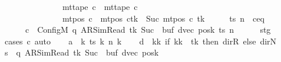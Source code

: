 \begin{isabellebody}
\ \ \ \ \ \ \ \ \ \ \ \ \ \ {\isasymand}\ mt{\isacharunderscore}{\kern0pt}tape\ c{\isacharprime}{\kern0pt}{\isacharprime}{\kern0pt}\ {\isacharequal}{\kern0pt}\ mt{\isacharunderscore}{\kern0pt}tape\ c{\isacharprime}{\kern0pt}\isanewline
\ \ \ \ \ \ \ \ \ \ \ \ \ \ {\isasymand}\ mt{\isacharunderscore}{\kern0pt}pos\ c{\isacharprime}{\kern0pt}{\isacharprime}{\kern0pt}\ {\isacharequal}{\kern0pt}\ {\isacharparenleft}{\kern0pt}mt{\isacharunderscore}{\kern0pt}pos\ c{\isacharprime}{\kern0pt}{\isacharparenright}{\kern0pt}{\isacharparenleft}{\kern0pt}tk\ {\isacharcolon}{\kern0pt}{\isacharequal}{\kern0pt}\ Suc\ {\isacharparenleft}{\kern0pt}mt{\isacharunderscore}{\kern0pt}pos\ c{\isacharprime}{\kern0pt}\ tk{\isacharparenright}{\kern0pt}{\isacharparenright}{\kern0pt}{\isachardoublequoteclose}\isanewline
%
\isadelimproof
%
\endisadelimproof
%
\isatagproof
{}\isamarkupfalse%
\ {\isacharminus}{\kern0pt}\isanewline
\ \ \isamarkupfalse%
\ ts\ n\ \ c{\isacharprime}{\kern0pt}{\isacharunderscore}{\kern0pt}eq{\isacharcolon}{\kern0pt}\isanewline
\ \ \ \ \ \ {\isachardoublequoteopen}c{\isacharprime}{\kern0pt}\ {\isacharequal}{\kern0pt}\ Config\isactrlsub M\ {\isacharparenleft}{\kern0pt}q{\isacharcomma}{\kern0pt}\ AR{\isacharunderscore}{\kern0pt}SimRead{\isacharcomma}{\kern0pt}\ tk{\isacharcomma}{\kern0pt}\ Suc\ {}{\isacharcomma}{\kern0pt}\ buf{\isacharcomma}{\kern0pt}\ dvec{\isacharcomma}{\kern0pt}\ posk{\isacharparenright}{\kern0pt}\ ts\ n{\isachardoublequoteclose}\isanewline
\ \ \ \ \isamarkupfalse%
\ stg\ \isamarkupfalse%
\ {\isacharparenleft}{\kern0pt}cases\ c{\isacharprime}{\kern0pt}{\isacharparenright}{\kern0pt}\ auto\isanewline
\ \ \isamarkupfalse%
\ {\isacharquery}{\kern0pt}a\ {\isacharequal}{\kern0pt}\ {\isachardoublequoteopen}{\isasymlambda}k{\isachardot}{\kern0pt}\ ts\ k\ {\isacharparenleft}{\kern0pt}n\ k{\isacharparenright}{\kern0pt}{\isachardoublequoteclose}\isanewline
\ \ \isamarkupfalse%
\ {\isacharquery}{\kern0pt}d\ {\isacharequal}{\kern0pt}\ {\isachardoublequoteopen}{\isasymlambda}kk{\isachardot}{\kern0pt}\ if\ kk\ {\isacharequal}{\kern0pt}\ tk\ then\ dir{\isachardot}{\kern0pt}R\ else\ dir{\isachardot}{\kern0pt}N{\isachardoublequoteclose}\isanewline
\ \ \isamarkupfalse%
\ {\isacharquery}{\kern0pt}s\ {\isacharequal}{\kern0pt}\ {\isachardoublequoteopen}{\isacharparenleft}{\kern0pt}q{\isacharcomma}{\kern0pt}\ AR{\isacharunderscore}{\kern0pt}SimRead{\isacharcomma}{\kern0pt}\ tk{\isacharcomma}{\kern0pt}\ Suc\ {}{\isacharcomma}{\kern0pt}\ buf{\isacharcomma}{\kern0pt}\ dvec{\isacharcomma}{\kern0pt}\ posk{\isacharparenright}{\kern0pt}{\isachardoublequoteclose}\isanewline

\end{isabellebody}

